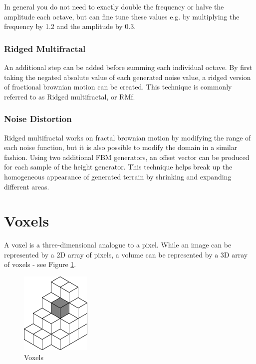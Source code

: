 In general you do not need to exactly double the frequency or halve the amplitude each octave, but can fine tune these values e.g. by multiplying the frequency by 1.2 and the amplitude by 0.3.

\subsubsection{Ridged Multifractal}

An additional step can be added before summing each individual octave.
By first taking the negated absolute value of each generated noise value, a ridged version of fractional brownian motion can be created.
This technique is commonly referred to as Ridged multifractal, or RMf.

\subsubsection{Noise Distortion}

Ridged multifractal works on fractal brownian motion by modifying the range of each noise function, but it is also possible to modify the domain in a similar fashion.
Using two additional FBM generators, an offset vector can be produced for each sample of the height generator.
This technique helps break up the homogeneous appearance of generated terrain by shrinking and expanding different areas.


\section{Voxels} \label{voxels}

A voxel is a three-dimensional analogue to a pixel.
While an image can be represented by a 2D array of pixels, a volume can be represented by a 3D array of voxels - see Figure \ref{fig:voxels}.

\begin{figure}
	\centering
		\includegraphics[width=0.3\textwidth]{figures/voxels}
	\caption{Voxels}
	\label{fig:voxels}
\end{figure}

